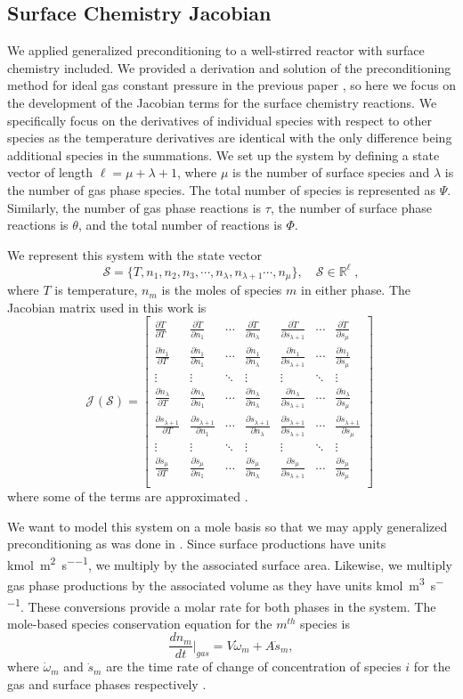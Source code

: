 \documentclass{article}
\newcommand{\sectionTwo}[1]{\subsection{#1} \addvspace{10pt}}
\def\nreactions{\Phi}
\def\gasreactions{\tau}
\def\surfreactions{\theta}
\def\nspecies{\Psi}
\def\gasspecies{\lambda}
\def\surfspecies{\mu}
\def \bmh{5pt} %
\newcommand{\pderv}[2]
{
    \frac{\partial #1}{\partial #2}
}
\newcommand{\jacsurfline}[1]
{
    \pderv{#1}{T} & \pderv{#1}{n_1} &
    \cdots & \pderv{#1}{n_\gasspecies}  & \pderv{#1}{s_{\gasspecies + 1}} &
    \cdots & \pderv{#1}{s_\surfspecies}\\[\bmh]
}
\newcommand{\dotsline}
{
    \vdots & \vdots &
    \ddots & \vdots & \vdots &
    \ddots & \vdots \\[\bmh]
}
\def\S{\mathcal{S}}
\newcommand{\J}[2][]{\mathcal{J}^{#1}(#2)}
\begin{document}
\sectionTwo{Surface Chemistry Jacobian}
We applied generalized preconditioning to a well-stirred reactor with surface chemistry included.
We provided a derivation and solution of the preconditioning method for ideal gas constant pressure in the previous paper \cite{walker2022generalized}, so here we focus on the development of the Jacobian terms for the surface chemistry reactions.
We specifically focus on the derivatives of individual species with respect to other species as the temperature derivatives are identical with the only difference being additional species in the summations.
We set up the system by defining a state vector of length $\ell = \surfspecies + \gasspecies + 1$, where $\surfspecies$ is the number of surface species and $\gasspecies$ is the number of gas phase species. The total number of species is represented as $\nspecies$.
Similarly, the number of gas phase reactions is $\gasreactions$, the number of surface phase reactions is $\surfreactions$, and the total number of reactions is $\nreactions$.

We represent this system with the state vector
\begin{equation}
    \S{} = \{T, n_1, n_2, n_3, \cdots, n_{\gasspecies}, n_{\gasspecies+1} \cdots, n_{\surfspecies}\},\quad\S{}\in\mathbb{R}^\ell \;,
\end{equation}
where $T$ is temperature, $n_{m}$ is the moles of species $m$ in either phase.
The Jacobian matrix used in this work is
\begin{equation}
    \J{\S{}} =
    \begin{bmatrix}
        \jacsurfline{\dot{T}}
        \jacsurfline{\dot{n}_{1}}
        \dotsline{}
        \jacsurfline{\dot{n}_{\gasspecies}}
        \jacsurfline{\dot{s}_{\gasspecies+1}}
        \dotsline{}
        \jacsurfline{\dot{s}_{\surfspecies}}
    \end{bmatrix} \;
\end{equation}
where some of the terms are approximated \cite{walker2022generalized}.

We want to model this system on a mole basis so that we may apply generalized preconditioning as was done in \cite{walker2022generalized}.
Since surface productions have units \si{\kilo\mole\per\meter\squared\per\second}, we multiply by the associated surface area.
Likewise, we multiply gas phase productions by the associated volume as they have units \si{\kilo\mole\per\meter\cubed\per\second}.
These conversions provide a molar rate for both phases in the system.
The mole-based species conservation equation for the $m^{th}$ species is
\begin{equation}
    \label{eq:species-cons}
    \frac{dn_{m}}{dt}\Big\vert_{gas} = V \dot{\omega}_{m} + A \dot{s}_{m},
\end{equation}
where $\dot{\omega}_{m}$ and $\dot{s}_{m}$ are the time rate of change of concentration of species $i$ for the gas and surface phases respectively \cite{walker2022generalized}.
\end{document}
